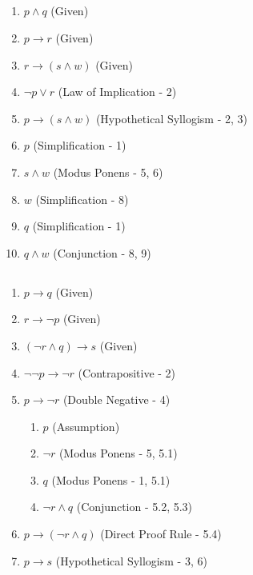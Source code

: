 \documentclass[11pt]{article}
\makeatletter
\def\imp{\rightarrow}
\newenvironment{level}%
{\addtolength{\itemindent}{2em}}%
{\addtolength{\itemindent}{-2em}}
\renewenvironment{proof}[1][\proofname]{\par
  \normalfont \topsep6\p@\@plus6\p@\relax
  \trivlist
  \item[\hskip\labelsep
        \itshape
    #1\@addpunct{.}]\ignorespaces
}{%
  \endtrivlist\@endpefalse
}
\makeatother
\begin{document}
\subsection{} %
\begin{proof}[\textbf{Prove $q \land w$}] \leavevmode
	\begin{enumerate}
		\item $p \land q$ \hfill (Given)
		\item $p \imp r$ \hfill (Given)
		\item $r \imp (s \land w)$ \hfill (Given)
		\item $\neg p \lor r$ \hfill (Law of Implication - 2)
		\item $p \imp (s \land w)$ \hfill (Hypothetical Syllogism - 2, 3)
		\item $p$ \hfill (Simplification - 1)
		\item $s \land w$ \hfill (Modus Ponens - 5, 6)
		\item $w$ \hfill (Simplification - 8) 
		\item $q$ \hfill (Simplification - 1) 
		\item $q \land w$ \hfill (Conjunction - 8, 9)
	\end{enumerate}
\end{proof}

\subsection{} %
\begin{proof}[\textbf{Prove $p \imp s$}] \leavevmode
	\begin{enumerate}
		\item $p \imp q$ \hfill (Given)
		\item $r \imp \neg p$ \hfill (Given)
		\item $(\neg r \land q) \imp s$ \hfill (Given) 
		\item $\neg \neg p \imp \neg r$ \hfill (Contrapositive - 2)
		\item $p \imp \neg r$ \hfill (Double Negative - 4) 
		\begin{enumerate}
		\begin{level}
			\item $p$ \hfill (Assumption)
			\item $\neg r$ \hfill (Modus Ponens - 5, 5.1)
			\item $q$ \hfill (Modus Ponens - 1, 5.1)
			\item $\neg r \land q$ \hfill (Conjunction - 5.2, 5.3)
		\end{level}
		\end{enumerate}
		\item $p \imp (\neg r \land q)$ \hfill (Direct Proof Rule - 5.4)
		\item $p \imp s$ \hfill (Hypothetical Syllogism - 3, 6)
	\end{enumerate}
\end{proof}
\end{document}
